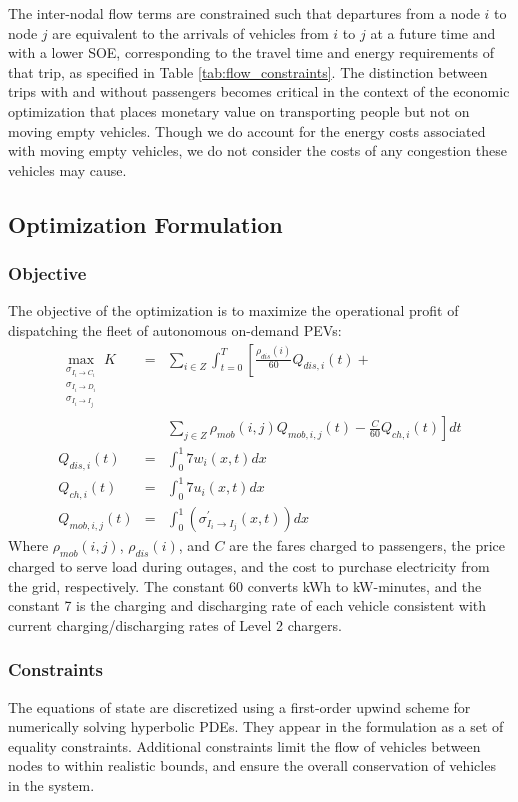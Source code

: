 \documentclass[conference]{IEEEtran}
\begin{document}
The inter-nodal flow terms are constrained such that departures from a node $i$ to node $j$ are equivalent to the arrivals of vehicles from $i$ to $j$ at a future time and with a lower SOE, corresponding to the travel time and energy requirements of that trip, as specified in Table \ref{tab:flow_constraints}. The distinction between trips with and without passengers becomes critical in the context of the economic optimization that places monetary value on transporting people but not on moving empty vehicles. Though we do account for the energy costs associated with moving empty vehicles, we do not consider the costs of any congestion these vehicles may cause.

\subsection{Optimization Formulation}
\subsubsection{Objective}
The objective of the optimization is to maximize the operational profit of dispatching the fleet of autonomous on-demand PEVs:
\begin{eqnarray*}
  \max_{\substack{\sigma_{I_i \rightarrow C_i} \\
    \sigma_{I_i \rightarrow D_i} \\ 
    \sigma_{I_i \rightarrow I_j}}}
    K &=& \sum_{i\in Z} \int_{t=0}^{T} \left[ \frac{\rho_{dis}(i)}{60} Q_{dis,i}(t) + \right. \\ 
      && \left. \sum_{j\in Z}\rho_{mob}(i,j)Q_{mob,i,j}(t)  - \frac{C}{60}Q_{ch,i}(t) \right]dt\\
    Q_{dis,i}(t) & = & \int_{0}^{1} 7 w_i(x,t) dx \\
    Q_{ch,i}(t) & = & \int_{0}^{1} 7 u_i(x,t) dx \\
    Q_{mob,i,j}(t) & = & \int_{0}^{1}\left( \sigma_{I_i \rightarrow I_j}^\prime(x,t) \right)dx
\end{eqnarray*}
Where $\rho_{mob}(i,j)$, $\rho_{dis}(i)$, and $C$ are the fares charged to passengers, the price charged to serve load during outages, and the cost to purchase electricity from the grid, respectively. The constant 60 converts kWh to kW-minutes, and the constant 7 is the charging and discharging rate of each vehicle consistent with current charging/discharging rates of Level 2 chargers.

\subsubsection{Constraints}
The equations of state are discretized using a first-order upwind scheme for numerically solving hyperbolic PDEs. They appear in the formulation as a set of equality constraints. Additional constraints limit the flow of vehicles between nodes to within realistic bounds, and ensure the overall conservation of vehicles in the system.
\end{document}
